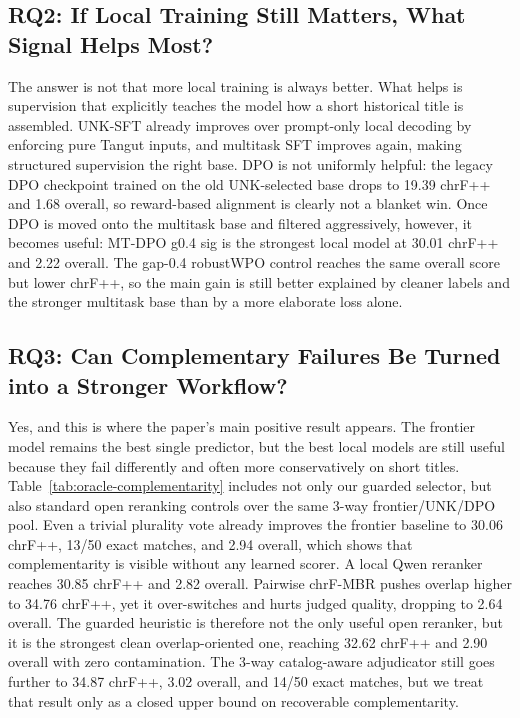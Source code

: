 \subsection{RQ2: If Local Training Still Matters, What Signal Helps Most?}

The answer is not that more local training is always better. What helps is supervision that explicitly teaches the model how a short historical title is assembled. UNK-SFT already improves over prompt-only local decoding by enforcing pure Tangut inputs, and multitask SFT improves again, making structured supervision the right base. DPO is not uniformly helpful: the legacy DPO checkpoint trained on the old UNK-selected base drops to 19.39 chrF++ and 1.68 overall, so reward-based alignment is clearly not a blanket win. Once DPO is moved onto the multitask base and filtered aggressively, however, it becomes useful: MT-DPO g0.4 sig is the strongest local model at 30.01 chrF++ and 2.22 overall. The gap-0.4 robustWPO control reaches the same overall score but lower chrF++, so the main gain is still better explained by cleaner labels and the stronger multitask base than by a more elaborate loss alone.

\subsection{RQ3: Can Complementary Failures Be Turned into a Stronger Workflow?}

Yes, and this is where the paper's main positive result appears. The frontier model remains the best single predictor, but the best local models are still useful because they fail differently and often more conservatively on short titles. Table~\ref{tab:oracle-complementarity} includes not only our guarded selector, but also standard open reranking controls over the same 3-way frontier/UNK/DPO pool. Even a trivial plurality vote already improves the frontier baseline to 30.06 chrF++, 13/50 exact matches, and 2.94 overall, which shows that complementarity is visible without any learned scorer. A local Qwen reranker reaches 30.85 chrF++ and 2.82 overall. Pairwise chrF-MBR pushes overlap higher to 34.76 chrF++, yet it over-switches and hurts judged quality, dropping to 2.64 overall. The guarded heuristic is therefore not the only useful open reranker, but it is the strongest clean overlap-oriented one, reaching 32.62 chrF++ and 2.90 overall with zero contamination. The 3-way catalog-aware adjudicator still goes further to 34.87 chrF++, 3.02 overall, and 14/50 exact matches, but we treat that result only as a closed upper bound on recoverable complementarity.

